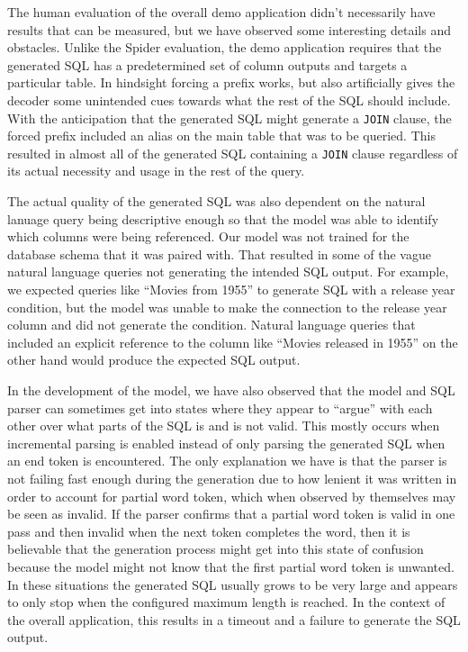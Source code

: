 \documentclass[11pt]{article}
\begin{document}
The human evaluation of the overall demo application didn't necessarily have results that can be measured, but we have observed some interesting details and obstacles. Unlike the Spider evaluation, the demo application requires that the generated SQL has a predetermined set of column outputs and targets a particular table. In hindsight forcing a prefix works, but also artificially gives the decoder some unintended cues towards what the rest of the SQL should include. With the anticipation that the generated SQL might generate a \texttt{JOIN} clause, the forced prefix included an alias on the main table that was to be queried. This resulted in almost all of the generated SQL containing a \texttt{JOIN} clause regardless of its actual necessity and usage in the rest of the query.

The actual quality of the generated SQL was also dependent on the natural lanuage query being descriptive enough so that the model was able to identify which columns were being referenced. Our model was not trained for the database schema that it was paired with. That resulted in some of the vague natural language queries not generating the intended SQL output. For example, we expected queries like ``Movies from 1955'' to generate SQL with a release year condition, but the model was unable to make the connection to the release year column and did not generate the condition. Natural language queries that included an explicit reference to the column like ``Movies released in 1955'' on the other hand would produce the expected SQL output.

In the development of the model, we have also observed that the model and SQL parser can sometimes get into states where they appear to ``argue'' with each other over what parts of the SQL is and is not valid. This mostly occurs when incremental parsing is enabled instead of only parsing the generated SQL when an end token is encountered. The only explanation we have is that the parser is not failing fast enough during the generation due to how lenient it was written in order to account for partial word token, which when observed by themselves may be seen as invalid. If the parser confirms that a partial word token is valid in one pass and then invalid when the next token completes the word, then it is believable that the generation process might get into this state of confusion because the model might not know that the first partial word token is unwanted. In these situations the generated SQL usually grows to be very large and appears to only stop when the configured maximum length is reached. In the context of the overall application, this results in a timeout and a failure to generate the SQL output.
\end{document}
